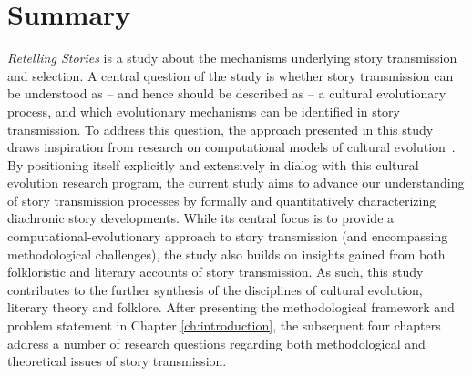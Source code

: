 
\chapter*{Summary} 

\noindent \emph{Retelling Stories} is a study about the mechanisms underlying story transmission and selection. A central question of the study is whether story transmission can be understood as -- and hence should be described as -- a cultural evolutionary process, and which evolutionary mechanisms can be identified in story transmission. To address this question, the approach presented in this study draws inspiration from research on computational models of cultural evolution~\autocite[E.g.][]{sforzafeldman:1981,boyd_richerson:1985,mesoudi:2011,mesoudi:2015}. By positioning itself explicitly and extensively in dialog with this cultural evolution research program, the current study aims to advance our understanding of story transmission processes by formally and quantitatively characterizing diachronic story developments. While its central focus is to provide a computational-evolutionary approach to story transmission (and encompassing methodological challenges), the study also builds on insights gained from both folkloristic and literary accounts of story transmission\autocite[E.g.][]{stephens_mccallum,boyd:2009,boyd:2010,zipes:2006,zipes:2012,geerts:2014}. As such, this study contributes to the further synthesis of the disciplines of cultural evolution, literary theory and folklore. After presenting the methodological framework and problem statement in Chapter \ref{ch:introduction}, the subsequent four chapters address a number of research questions regarding both methodological and theoretical issues of story transmission.

